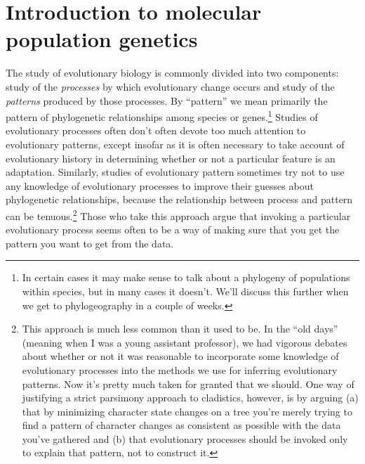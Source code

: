 \chapter{Introduction to molecular population genetics}

The study of evolutionary biology is commonly divided into two
components: study of the {\it processes\/} by which evolutionary
change occurs and study of the {\it patterns\/} produced by those
processes. By ``pattern'' we mean primarily the pattern of
phylogenetic relationships among species or genes.\footnote{In certain
  cases it may make sense to talk about a phylogeny of populations
  within species, but in many cases it doesn't. We'll discuss this
  further when we get to phylogeography in a couple of weeks.} Studies
of evolutionary processes often don't often devote too much attention
to evolutionary patterns, except insofar as it is often necessary to
take account of evolutionary history in determining whether or not a
particular feature is an adaptation. Similarly, studies of
evolutionary pattern sometimes try not to use any knowledge of
evolutionary processes to improve their guesses about phylogenetic
relationships, because the relationship between process and pattern
can be tenuous.\footnote{This approach is much less common than it
  used to be. In the ``old days'' (meaning when I was a young
  assistant professor), we had vigorous debates about whether or not
  it was reasonable to incorporate some knowledge of evolutionary
  processes into the methods we use for inferring evolutionary
  patterns. Now it's pretty much taken for granted that we should. One
  way of justifying a strict parsimony approach to cladistics,
  however, is by arguing (a) that by minimizing character state
  changes on a tree you're merely trying to find a pattern of
  character changes as consistent as possible with the data you've
  gathered and (b) that evolutionary processes should be invoked only
  to explain that pattern, not to construct it.} Those who take this
approach argue that invoking a particular evolutionary process seems
often to be a way of making sure that you get the pattern you want to
get from the data.

